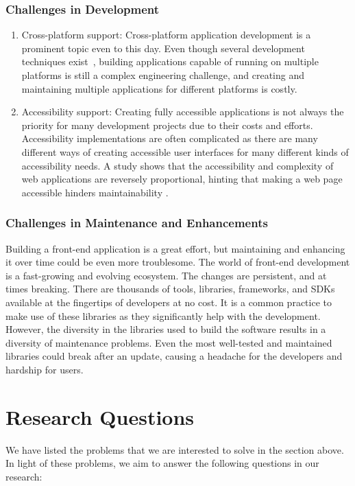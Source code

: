 \subsubsection{Challenges in Development}
\begin{enumerate}
  \item Cross-platform support:
  Cross-platform application development is a prominent topic even to this day. Even though several development techniques exist~\cite{PWAs}, building applications capable of running on multiple platforms is still a complex engineering challenge, and creating and maintaining multiple applications for different platforms is costly. 
  \item Accessibility support:
  Creating fully accessible applications is not always the priority for many development projects due to their costs and efforts. Accessibility implementations are often complicated as there are many different ways of creating accessible user interfaces for many different kinds of accessibility needs. A study shows that the accessibility and complexity of web applications are reversely proportional, hinting that making a web page accessible hinders maintainability \cite{WebNotForAll}.
\end{enumerate}

\subsubsection{Challenges in Maintenance and Enhancements}
Building a front-end application is a great effort, but maintaining and enhancing it over time could be even more troublesome. The world of front-end development is a fast-growing and evolving ecosystem. The changes are persistent, and at times breaking. There are thousands of tools, libraries, frameworks, and SDKs available at the fingertips of developers at no cost. It is a common practice to make use of these libraries as they significantly help with the development. However, the diversity in the libraries used to build the software results in a diversity of maintenance problems. Even the most well-tested and maintained libraries could break after an update, causing a headache for the developers and hardship for users.


\section{Research Questions} \label{researchQuestions}

We have listed the problems that we are interested to solve in the section above. In light of these problems, we aim to answer the following questions in our research:

